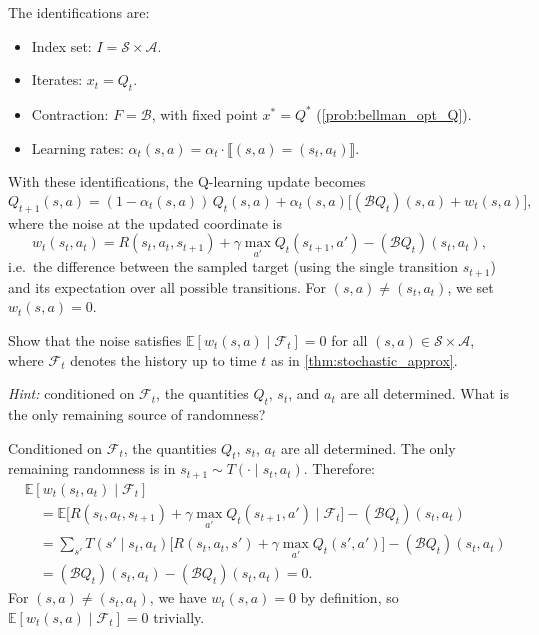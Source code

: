 \documentclass[11pt]{article}
\newcommand{\cS}{\mathcal{S}}
\newcommand{\cA}{\mathcal{A}}
\begin{document}
\begin{solution}
The identifications are:
\begin{itemize}
\item Index set: $I = \cS \times \cA$.
\item Iterates: $x_t = Q_t$.
\item Contraction: $F = \mathcal{B}$, with fixed point $x^* = Q^*$ (\cref{prob:bellman_opt_Q}).
\item Learning rates: $\alpha_t(s,a) = \alpha_t \cdot \llbracket (s,a) = (s_t, a_t) \rrbracket$.
\end{itemize}
With these identifications, the Q-learning update becomes
$$
Q_{t+1}(s,a) = (1 - \alpha_t(s,a))\, Q_t(s,a) + \alpha_t(s,a)\bigl[(\mathcal{B}Q_t)(s,a) + w_t(s,a)\bigr],
$$
where the noise at the updated coordinate is
$$
w_t(s_t, a_t) = R(s_t, a_t, s_{t+1}) + \gamma \max_{a'} Q_t(s_{t+1}, a') - (\mathcal{B}Q_t)(s_t, a_t),
$$
i.e.\ the difference between the sampled target (using the single transition $s_{t+1}$) and its expectation over all possible transitions. For $(s,a) \neq (s_t, a_t)$, we set $w_t(s,a) = 0$.
\end{solution}

\begin{exercise}
\label{prob:noise_zero_mean} Show that the noise satisfies $\mathbb{E}[w_t(s,a) \mid \mathcal{F}_t] = 0$ for all $(s,a) \in \cS \times \cA$, where $\mathcal{F}_t$ denotes the history up to time $t$ as in \cref{thm:stochastic_approx}.

\textit{Hint:} conditioned on $\mathcal{F}_t$, the quantities $Q_t$, $s_t$, and $a_t$ are all determined. What is the only remaining source of randomness?
\end{exercise}

\begin{solution}
Conditioned on $\mathcal{F}_t$, the quantities $Q_t$, $s_t$, $a_t$ are all determined. The only remaining randomness is in $s_{t+1} \sim T(\cdot \mid s_t, a_t)$. Therefore:
\begin{align*}
&\mathbb{E}[w_t(s_t, a_t) \mid \mathcal{F}_t] \\
&\quad= \mathbb{E}\bigl[R(s_t, a_t, s_{t+1}) + \gamma \max_{a'} Q_t(s_{t+1}, a') \mid \mathcal{F}_t\bigr] - (\mathcal{B}Q_t)(s_t, a_t) \\
&\quad= \sum_{s'} T(s' \mid s_t, a_t)\bigl[R(s_t, a_t, s') + \gamma \max_{a'} Q_t(s', a')\bigr] - (\mathcal{B}Q_t)(s_t, a_t) \\
&\quad= (\mathcal{B}Q_t)(s_t, a_t) - (\mathcal{B}Q_t)(s_t, a_t) = 0.
\end{align*}
For $(s,a) \neq (s_t, a_t)$, we have $w_t(s,a) = 0$ by definition, so $\mathbb{E}[w_t(s,a) \mid \mathcal{F}_t] = 0$ trivially.
\end{solution}
\end{document}
